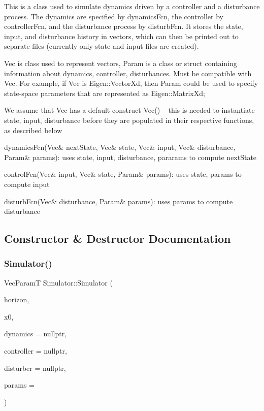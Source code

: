This is a class used to simulate dynamics driven by a controller and a disturbance process. The dynamics are specified by dynamics\+Fcn, the controller by controller\+Fcn, and the disturbance process by disturb\+Fcn. It stores the state, input, and disturbance history in vectors, which can then be printed out to separate files (currently only state and input files are created).

Vec is class used to represent vectors, Param is a class or struct containing information about dynamics, controller, disturbances. Must be compatible with Vec. For example, if Vec is Eigen\+::\+Vector\+Xd, then Param could be used to specify state-\/space parameters that are represented as Eigen\+::\+Matrix\+Xd;

We assume that Vec has a default construct Vec() -- this is needed to instantiate state, input, disturbance before they are populated in their respective functions, as described below

dynamics\+Fcn(Vec\& next\+State, Vec\& state, Vec\& input, Vec\& disturbance, Param\& params)\+: uses state, input, disturbance, pararams to compute next\+State

control\+Fcn(\+Vec\& input, Vec\& state, Param\& params)\+: uses state, params to compute input

disturb\+Fcn(\+Vec\& disturbance, Param\& params)\+: uses params to compute disturbance 

\subsection{Constructor \& Destructor Documentation}
\mbox{\label{classSimulator_a4cfe319e3abf788ce05e1ddb322a904e}} 
\subsubsection{\texorpdfstring{Simulator()}{Simulator()}}
{\footnotesize\ttfamily Vec\+ParamT Simulator\+::\+Simulator (\begin{DoxyParamCaption}\item[{int}]{horizon,  }\item[{const Vec \&}]{x0,  }\item[{dynamics\+Fcn}]{dynamics = {\ttfamily nullptr},  }\item[{control\+Fcn}]{controller = {\ttfamily nullptr},  }\item[{disturb\+Fcn}]{disturber = {\ttfamily nullptr},  }\item[{Param \&}]{params = {} }\end{DoxyParamCaption})}



